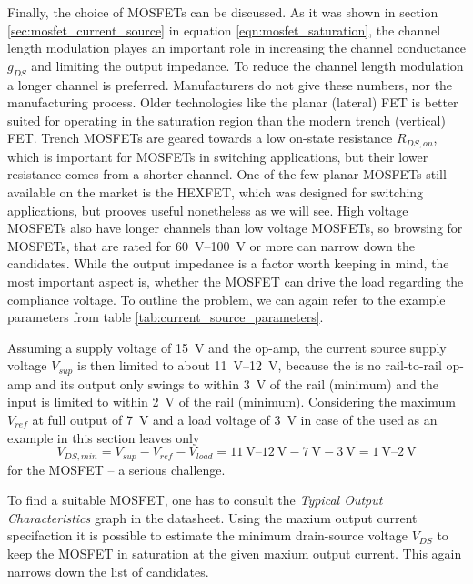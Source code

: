 Finally, the choice of MOSFETs can be discussed. As it was shown in section \ref{sec:mosfet_current_source} in equation \ref{eqn:mosfet_saturation}, the channel length modulation playes an important role in increasing the channel conductance $g_{DS}$ and limiting the output impedance. To reduce the channel length modulation a longer channel is preferred. Manufacturers do not give these numbers, nor the manufacturing process. Older technologies like the planar (lateral) FET is better suited for operating in the saturation region than the modern trench (vertical) FET. Trench MOSFETs are geared towards a low on-state resistance $R_{DS,on}$, which is important for MOSFETs in switching applications, but their lower resistance comes from a shorter channel. One of the few planar MOSFETs still available on the market is the HEXFET, which was designed for switching applications, but prooves useful nonetheless as we will see. High voltage MOSFETs also have longer channels than low voltage MOSFETs, so browsing for MOSFETs, that are rated for \qtyrange[range-units = single]{60}{100}{\V} or more can narrow down the candidates. While the output impedance is a factor worth keeping in mind, the most important aspect is, whether the MOSFET can drive the load regarding the compliance voltage. To outline the problem, we can again refer to the example parameters from table \ref{tab:current_source_parameters}.

Assuming a supply voltage of \qty{15}{\V} and the  op-amp, the current source supply voltage $V_{sup}$ is then limited to about \qtyrange[range-units = single]{11}{12}{\V}, because the  is no rail-to-rail op-amp and its output only swings to within \qty{3}{\V} of the rail (minimum) and the input is limited to within \qty{2}{\V} of the rail (minimum). Considering the maximum $V_{ref}$ at full output of \qty{7}{\V} and a load voltage of \qty{3}{\V} in case of the  \cite{datasheet_thorlabs_780nm} used as an example in this section leaves only
\begin{equation}
    V_{DS,min} = V_{sup} - V_{ref} - V_{load} = \qtyrange[range-units = bracket]{11}{12}{\V} - \qty{7}{\V} - \qty{3}{\V} = \qtyrange[range-units = bracket]{1}{2}{\V} \label{eqn:minimum_mosfet_vds}
\end{equation}
for the MOSFET -- a serious challenge.

To find a suitable MOSFET, one has to consult the \textit{Typical Output Characteristics} graph in the datasheet. Using the maxium output current specifaction it is possible to estimate the minimum drain-source voltage $V_{DS}$ to keep the MOSFET in saturation at the given maxium output current. This again narrows down the list of candidates.

